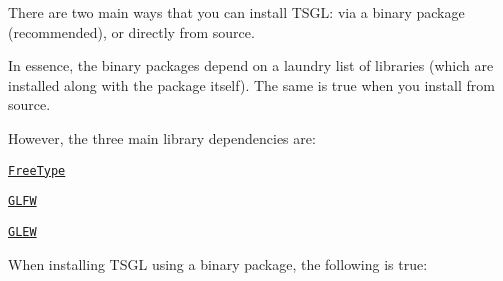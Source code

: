 There are two main ways that you can install T\-S\-G\-L\-: via a binary package (recommended), or directly from source.

In essence, the binary packages depend on a laundry list of libraries (which are installed along with the package itself). The same is true when you install from source.

However, the three main library dependencies are\-:


\begin{DoxyItemize}
\item \href{https://www.freetype.org/download.html}{\tt Free\-Type}
\item \href{https://www.glfw.org/download.html}{\tt G\-L\-F\-W}
\item \href{https://downloads.sourceforge.net/project/glew/glew/1.12.0/glew-1.12.0.zip}{\tt G\-L\-E\-W}
\end{DoxyItemize}

When installing T\-S\-G\-L using a binary package, the following is true\-:


